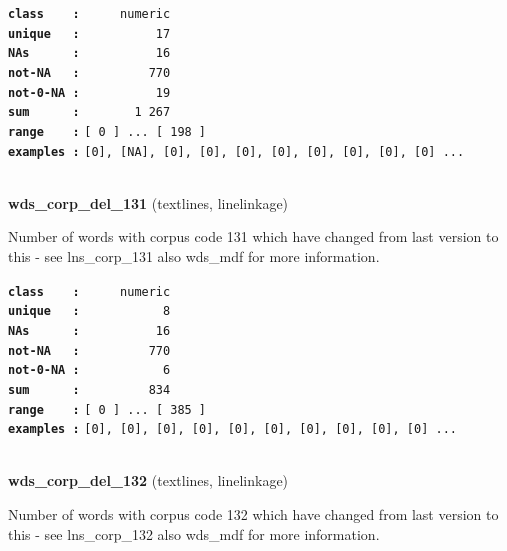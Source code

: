 \documentclass[]{article}
\begin{document}
\textbf{\texttt{class\ \ \ \ :}} \texttt{~~~~~numeric}\\
\textbf{\texttt{unique\ \ \ :}} \texttt{~~~~~~~~~~17}\\
\textbf{\texttt{NAs\ \ \ \ \ \ :}} \texttt{~~~~~~~~~~16}\\
\textbf{\texttt{not-NA\ \ \ :}} \texttt{~~~~~~~~~770}\\
\textbf{\texttt{not-0-NA\ :}} \texttt{~~~~~~~~~~19}\\
\textbf{\texttt{sum\ \ \ \ \ \ :}} \texttt{~~~~~~~1~267}\\
\textbf{\texttt{range\ \ \ \ :}}
\texttt{{[}\ 0\ {]}\ ...\ {[}\ 198\ {]}}\\
\textbf{\texttt{examples\ :}}
\texttt{{[}0{]},\ {[}NA{]},\ {[}0{]},\ {[}0{]},\ {[}0{]},\ {[}0{]},\ {[}0{]},\ {[}0{]},\ {[}0{]},\ {[}0{]}\ ...}\\

~

\textbf{wds\_corp\_del\_131} (textlines, linelinkage)

Number of words with corpus code 131 which have changed from last
version to this - see lns\_corp\_131 also wds\_mdf for more information.

\textbf{\texttt{class\ \ \ \ :}} \texttt{~~~~~numeric}\\
\textbf{\texttt{unique\ \ \ :}} \texttt{~~~~~~~~~~~8}\\
\textbf{\texttt{NAs\ \ \ \ \ \ :}} \texttt{~~~~~~~~~~16}\\
\textbf{\texttt{not-NA\ \ \ :}} \texttt{~~~~~~~~~770}\\
\textbf{\texttt{not-0-NA\ :}} \texttt{~~~~~~~~~~~6}\\
\textbf{\texttt{sum\ \ \ \ \ \ :}} \texttt{~~~~~~~~~834}\\
\textbf{\texttt{range\ \ \ \ :}}
\texttt{{[}\ 0\ {]}\ ...\ {[}\ 385\ {]}}\\
\textbf{\texttt{examples\ :}}
\texttt{{[}0{]},\ {[}0{]},\ {[}0{]},\ {[}0{]},\ {[}0{]},\ {[}0{]},\ {[}0{]},\ {[}0{]},\ {[}0{]},\ {[}0{]}\ ...}\\

~

\textbf{wds\_corp\_del\_132} (textlines, linelinkage)

Number of words with corpus code 132 which have changed from last
version to this - see lns\_corp\_132 also wds\_mdf for more information.
\end{document}
